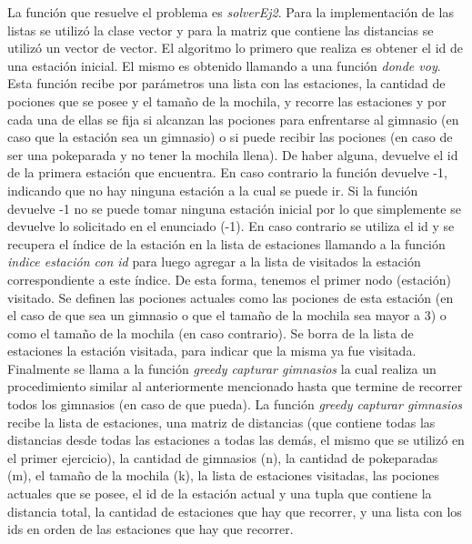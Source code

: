 La función que resuelve el problema es \textit{solverEj2}. Para la implementación de las listas se utilizó la clase vector y para la matriz que contiene las distancias se utilizó un vector de vector. El algoritmo lo primero que realiza es obtener el id de una estación inicial. El mismo es obtenido llamando a una función \textit{donde voy}. Esta función recibe por parámetros una lista con las estaciones, la cantidad de pociones que se posee y el tamaño de la mochila, y recorre las estaciones y por cada una de ellas se fija si alcanzan las pociones para enfrentarse al gimnasio (en caso que la estación sea un gimnasio) o si puede recibir las pociones (en caso de ser una pokeparada y no tener la mochila llena). De haber alguna, devuelve el id de la primera estación que encuentra. En caso contrario la función devuelve -1, indicando que no hay ninguna estación a la cual se puede ir. Si la función devuelve -1 no se puede tomar ninguna estación inicial por lo que simplemente se devuelve lo solicitado en el enunciado (-1). En caso contrario se utiliza el id y se recupera el índice de la estación en la lista de estaciones llamando a la función \textit{indice estación con id} para luego agregar a la lista de visitados la estación correspondiente a este índice. De esta forma, tenemos el primer nodo (estación) visitado. Se definen las pociones actuales como las pociones de esta estación (en el caso de que sea un gimnasio o que el tamaño de la mochila sea mayor a 3) o como el tamaño de la mochila (en caso contrario). Se borra de la lista de estaciones la estación visitada, para indicar que la misma ya fue visitada. Finalmente se llama a la función \textit{greedy capturar gimnasios} la cual realiza un procedimiento similar al anteriormente mencionado hasta que termine de recorrer todos los gimnasios (en caso de que pueda). La función \textit{greedy capturar gimnasios} recibe la lista de estaciones, una matriz de distancias (que contiene todas las distancias desde todas las estaciones a todas las demás, el mismo que se utilizó en el primer ejercicio), la cantidad de gimnasios (n), la cantidad de pokeparadas (m), el tamaño de la mochila (k), la lista de estaciones visitadas, las pociones actuales que se posee, el id de la estación actual y una tupla que contiene la distancia total, la cantidad de estaciones que hay que recorrer, y una lista con los ids en orden de las estaciones que hay que recorrer.




